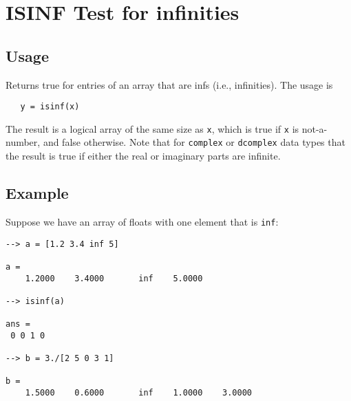 \section{ISINF Test for infinities}

\subsection{Usage}

Returns true for entries of an array that are infs (i.e.,
infinities).  The usage is
\begin{verbatim}
   y = isinf(x)
\end{verbatim}
The result is a logical array of the same size as \verb|x|,
which is true if \verb|x| is not-a-number, and false otherwise.
Note that for \verb|complex| or \verb|dcomplex| data types that
the result is true if either the real or imaginary parts
are infinite.
\subsection{Example}

Suppose we have an array of floats with one element that
is \verb|inf|:
\begin{verbatim}
--> a = [1.2 3.4 inf 5]

a = 
    1.2000    3.4000       inf    5.0000 

--> isinf(a)

ans = 
 0 0 1 0 

--> b = 3./[2 5 0 3 1]

b = 
    1.5000    0.6000       inf    1.0000    3.0000 
\end{verbatim}
